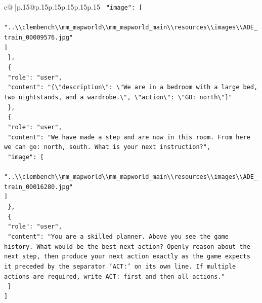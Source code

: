 \documentclass{article}
\begin{document}
{\begin{supertabular}{c@{$\;$}|p{.15\linewidth}@{}p{.15\linewidth}p{.15\linewidth}p{.15\linewidth}p{.15\linewidth}p{.15\linewidth}}
{{{\texttt{    "image": {[}} \\
\texttt{      "..\textbackslash{}\textbackslash{}clembench\textbackslash{}\textbackslash{}mm\_mapworld\textbackslash{}\textbackslash{}mm\_mapworld\_main\textbackslash{}\textbackslash{}resources\textbackslash{}\textbackslash{}images\textbackslash{}\textbackslash{}ADE\_train\_00009576.jpg"} \\
\texttt{    {]}} \\
\texttt{  \},} \\
\texttt{  \{} \\
\texttt{    "role": "user",} \\
\texttt{    "content": "\{\textbackslash{}"description\textbackslash{}": \textbackslash{}"We are in a bedroom with a large bed, two nightstands, and a wardrobe.\textbackslash{}", \textbackslash{}"action\textbackslash{}": \textbackslash{}"GO: north\textbackslash{}"\}"} \\
\texttt{  \},} \\
\texttt{  \{} \\
\texttt{    "role": "user",} \\
\texttt{    "content": "We have made a step and are now in this room. From here we can go: north, south. What is your next instruction?",} \\
\texttt{    "image": {[}} \\
\texttt{      "..\textbackslash{}\textbackslash{}clembench\textbackslash{}\textbackslash{}mm\_mapworld\textbackslash{}\textbackslash{}mm\_mapworld\_main\textbackslash{}\textbackslash{}resources\textbackslash{}\textbackslash{}images\textbackslash{}\textbackslash{}ADE\_train\_00016280.jpg"} \\
\texttt{    {]}} \\
\texttt{  \},} \\
\texttt{  \{} \\
\texttt{    "role": "user",} \\
\texttt{    "content": "You are a skilled planner. Above you see the game history. What would be the best next action? Openly reason about the next step, then produce your next action exactly as the game expects it preceded by the separator 'ACT:' on its own line. If multiple actions are required, write ACT: first and then all actions."} \\
\texttt{  \}} \\
\texttt{{]}} \\
            }
        }
    }
     \\ \\


\end{supertabular}}
\end{document}
